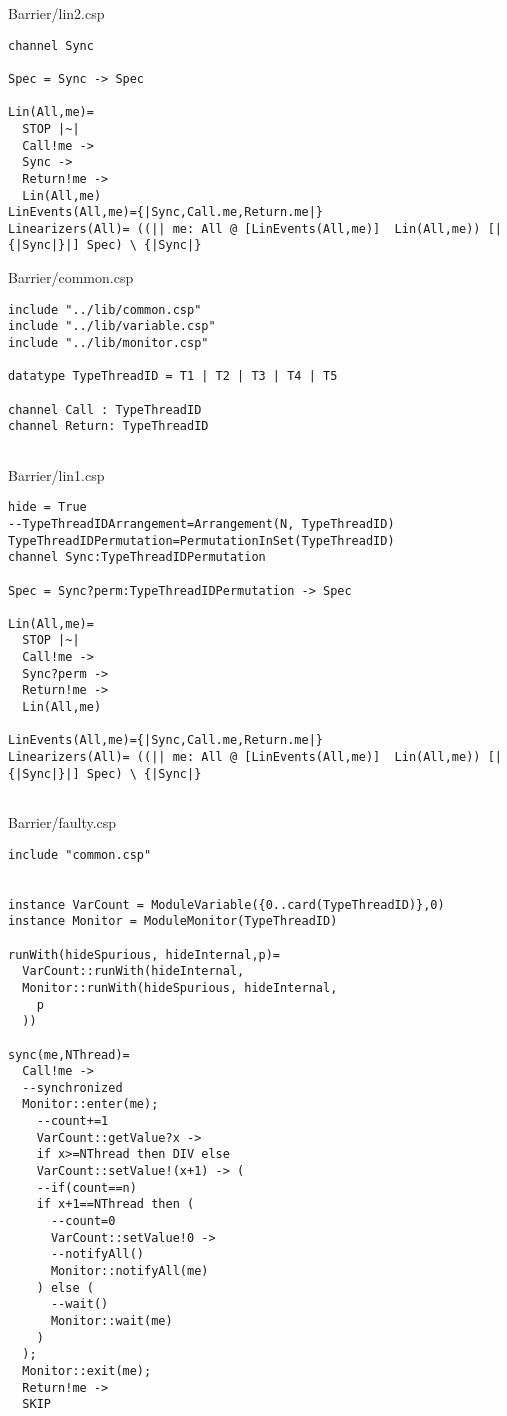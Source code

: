 Barrier/lin2.csp
\begin{lstlisting}
channel Sync

Spec = Sync -> Spec

Lin(All,me)=
  STOP |~|
  Call!me ->
  Sync ->
  Return!me ->
  Lin(All,me)
LinEvents(All,me)={|Sync,Call.me,Return.me|}
Linearizers(All)= ((|| me: All @ [LinEvents(All,me)]  Lin(All,me)) [|{|Sync|}|] Spec) \ {|Sync|}
\end{lstlisting}
Barrier/common.csp
\begin{lstlisting}
include "../lib/common.csp"
include "../lib/variable.csp"
include "../lib/monitor.csp"

datatype TypeThreadID = T1 | T2 | T3 | T4 | T5

channel Call : TypeThreadID
channel Return: TypeThreadID


\end{lstlisting}
Barrier/lin1.csp
\begin{lstlisting}
hide = True
--TypeThreadIDArrangement=Arrangement(N, TypeThreadID)
TypeThreadIDPermutation=PermutationInSet(TypeThreadID)
channel Sync:TypeThreadIDPermutation

Spec = Sync?perm:TypeThreadIDPermutation -> Spec

Lin(All,me)=
  STOP |~|
  Call!me ->
  Sync?perm ->
  Return!me ->
  Lin(All,me)
  
LinEvents(All,me)={|Sync,Call.me,Return.me|}
Linearizers(All)= ((|| me: All @ [LinEvents(All,me)]  Lin(All,me)) [|{|Sync|}|] Spec) \ {|Sync|}


\end{lstlisting}
Barrier/faulty.csp
\begin{lstlisting}
include "common.csp"


instance VarCount = ModuleVariable({0..card(TypeThreadID)},0)
instance Monitor = ModuleMonitor(TypeThreadID)

runWith(hideSpurious, hideInternal,p)=
  VarCount::runWith(hideInternal,
  Monitor::runWith(hideSpurious, hideInternal,
    p
  ))

sync(me,NThread)=
  Call!me ->
  --synchronized
  Monitor::enter(me);
    --count+=1
    VarCount::getValue?x ->
    if x>=NThread then DIV else
    VarCount::setValue!(x+1) -> (
    --if(count==n)
    if x+1==NThread then (
      --count=0
      VarCount::setValue!0 ->
      --notifyAll()
      Monitor::notifyAll(me)
    ) else (
      --wait()
      Monitor::wait(me)
    )
  );
  Monitor::exit(me);
  Return!me ->
  SKIP




\end{lstlisting}
